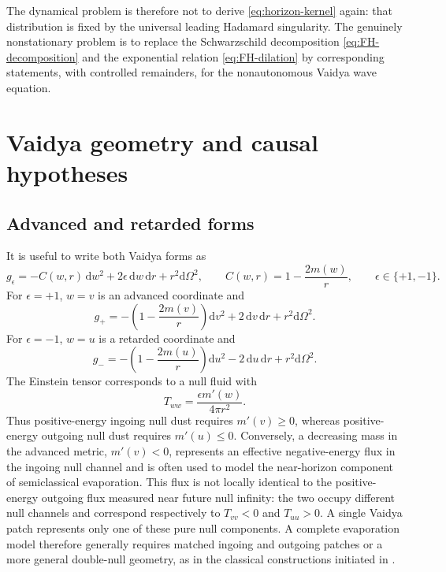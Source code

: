 \documentclass[11pt,a4paper]{article}
\theoremstyle{definition}
\theoremstyle{remark}
\newcommand{\dd}{\mathrm d}
\begin{document}
	The dynamical problem is therefore not to derive
	\eqref{eq:horizon-kernel} again: that distribution is fixed by the universal
	leading Hadamard singularity.  The genuinely nonstationary problem is to
	replace the Schwarzschild decomposition
	\eqref{eq:FH-decomposition} and the exponential relation
	\eqref{eq:FH-dilation} by corresponding statements, with controlled
	remainders, for the nonautonomous Vaidya wave equation.
	
	\section{Vaidya geometry and causal hypotheses}
	\label{sec:geometry}
	
	\subsection{Advanced and retarded forms}
	
	It is useful to write both Vaidya forms as
	\begin{equation}
		g_{\epsilon}
		=-C(w,r)\,\dd w^2+2\epsilon\,\dd w\,\dd r+r^2\dd\Omega^2,
		\qquad
		C(w,r)=1-\frac{2m(w)}{r},
		\qquad \epsilon\in\{+1,-1\}.
		\label{eq:unified-Vaidya}
	\end{equation}
	For $\epsilon=+1$, $w=v$ is an advanced coordinate and
	\begin{equation}
		g_+=-\left(1-\frac{2m(v)}r\right)\dd v^2
		+2\,\dd v\,\dd r+r^2\dd\Omega^2.
		\label{eq:ingoing-Vaidya}
	\end{equation}
	For $\epsilon=-1$, $w=u$ is a retarded coordinate and
	\begin{equation}
		g_-=-\left(1-\frac{2m(u)}r\right)\dd u^2
		-2\,\dd u\,\dd r+r^2\dd\Omega^2.
		\label{eq:outgoing-Vaidya}
	\end{equation}
	The Einstein tensor corresponds to a null fluid with
	\begin{equation}
		T_{ww}=\frac{\epsilon m'(w)}{4\pi r^2}.
		\label{eq:Vaidya-stress}
	\end{equation}
	Thus positive-energy ingoing null dust requires \(m'(v)\geq 0\), whereas positive-energy outgoing null dust requires \(m'(u)\leq 0\). Conversely, a decreasing mass in the advanced metric, \(m'(v) < 0 \), represents an effective negative-energy flux in the ingoing null channel and is often used to model the near-horizon component of semiclassical evaporation. This flux is not locally identical to the positive-energy outgoing flux measured near future null infinity: the two occupy different null channels and correspond respectively to \( T_{vv} < 0 \) and \( T_{uu} > 0 \). A single Vaidya patch represents only one of these pure null components. A complete evaporation model therefore generally requires matched ingoing and outgoing patches or a more general double-null geometry, as in the classical constructions initiated in \cite{Hiscock1981,Hiscock1981II}.
	
\end{document}
